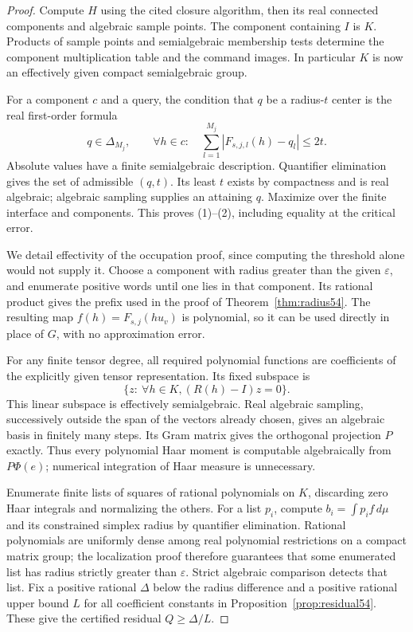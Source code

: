 \begin{proof}
Compute $H$ using the cited closure algorithm, then its real connected components and algebraic sample points. The component containing $I$ is $K$. Products of sample points and semialgebraic membership tests determine the component multiplication table and the command images. In particular $K$ is now an effectively given compact semialgebraic group.

For a component $c$ and a query, the condition that $q$ be a radius-$t$ center is the real first-order formula
\begin{equation}\label{eq:QEcenter54}
 q\in\Delta_{M_j},\qquad
 \forall h\in c:\quad
 \sum_{l=1}^{M_j}|F_{s,j,l}(h)-q_l|\le2t.
\end{equation}
Absolute values have a finite semialgebraic description. Quantifier elimination gives the set of admissible $(q,t)$. Its least $t$ exists by compactness and is real algebraic; algebraic sampling supplies an attaining $q$. Maximize over the finite interface and components. This proves (1)--(2), including equality at the critical error.

We detail effectivity of the occupation proof, since computing the threshold alone would not supply it. Choose a component with radius greater than the given $\varepsilon$, and enumerate positive words until one lies in that component. Its rational product gives the prefix used in the proof of Theorem~\ref{thm:radius54}. The resulting map $f(h)=F_{s,j}(hu_v)$ is polynomial, so it can be used directly in place of $G$, with no approximation error.

For any finite tensor degree, all required polynomial functions are coefficients of the explicitly given tensor representation. Its fixed subspace is
\[
 \{z:\ \forall h\in K,
                 (R(h)-I)z=0\}.
\]
This linear subspace is effectively semialgebraic. Real algebraic sampling, successively outside the span of the vectors already chosen, gives an algebraic basis in finitely many steps. Its Gram matrix gives the orthogonal projection $P$ exactly. Thus every polynomial Haar moment is computable algebraically from $P\Phi(e)$; numerical integration of Haar measure is unnecessary.

Enumerate finite lists of squares of rational polynomials on $K$, discarding zero Haar integrals and normalizing the others. For a list $p_i$, compute $b_i=\int p_if\,d\mu$ and its constrained simplex radius by quantifier elimination. Rational polynomials are uniformly dense among real polynomial restrictions on a compact matrix group; the localization proof therefore guarantees that some enumerated list has radius strictly greater than $\varepsilon$. Strict algebraic comparison detects that list. Fix a positive rational $\Delta$ below the radius difference and a positive rational upper bound $L$ for all coefficient constants in Proposition~\ref{prop:residual54}. These give the certified residual $Q\ge\Delta/L$.


\end{proof}
